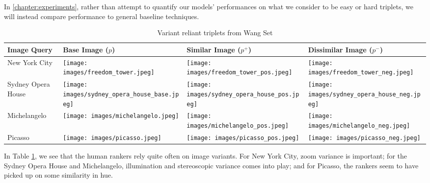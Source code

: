 In \ref{chapter:experiments}, rather than attempt to quantify our models' performances on what we consider to be easy or hard triplets, we will instead compare performance to general baseline techniques.

\begin{table}
	\begin{tabular}{>{\centering\arraybackslash}m{1in} >{\centering\arraybackslash}m{1.4in} >{\centering\arraybackslash}m{1.4in} >{\centering\arraybackslash}m{1.4in}}
		\toprule
		\bfseries Image Query & \bfseries Base Image ($p$) & \bfseries Similar Image ($p^+$) & \bfseries Dissimilar Image ($p^-$) \\
		\midrule
		\centering New York City & \texttt{[image: images/freedom\_tower.jpeg]} & \texttt{[image: images/freedom\_tower\_pos.jpeg]} & \texttt{[image: images/freedom\_tower\_neg.jpeg]}\\
		Sydney Opera House & \texttt{[image: images/sydney\_opera\_house\_base.jpeg]} & \texttt{[image: images/sydney\_opera\_house\_pos.jpeg]} & \texttt{[image: images/sydney\_opera\_house\_neg.jpeg]}\\
		Michelangelo & \texttt{[image: images/michelangelo.jpeg]} & \texttt{[image: images/michelangelo\_pos.jpeg]} & \texttt{[image: images/michelangelo\_neg.jpeg]}\\
		Picasso & \texttt{[image: images/picasso.jpeg]} & \texttt{[image: images/picasso\_pos.jpeg]} & \texttt{[image: images/picasso\_neg.jpeg]}\\
		\bottomrule
	\end{tabular}
	\caption{Variant reliant triplets from Wang Set}
	\label{table:variant_triplets}
\end{table}

In Table \ref{table:variant_triplets}, we see that the human rankers rely quite often on image variants. For New York City, zoom variance is important; for the Sydney Opera House and Michelangelo, illumination and stereoscopic variance comes into play; and for Picasso, the rankers seem to have picked up on some similarity in hue.


